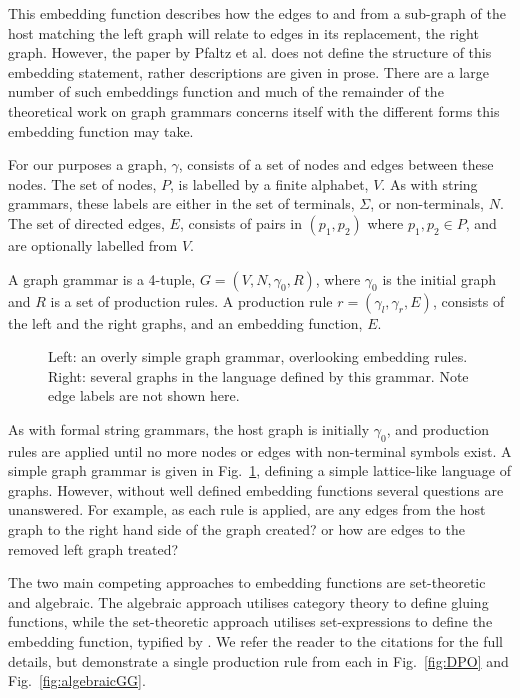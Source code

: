 This embedding function describes how the edges to and from a sub-graph of the host matching the left graph will relate to edges in its replacement, the right graph. However, the paper by Pfaltz et al. does not define the structure of this embedding statement, rather descriptions are given in prose. There are a large number of such embeddings function and much of the remainder of the theoretical work on graph grammars concerns itself with the different forms this embedding function may take. 

For our purposes a graph, $\gamma$, consists of a set of nodes and edges between these nodes. The set of nodes, $P$, is labelled by a finite alphabet, $V$. As with string grammars, these labels are either in the set of terminals, $\Sigma$, or non-terminals, $N$. The set of directed edges, $E$, consists of pairs in $(p_1, p_2)$ where $p_1, p_2 \in P$, and are optionally labelled from $V$.

A graph grammar is a 4-tuple, $G = (V, N, \gamma_0, R)$, where $\gamma_0$ is the initial graph and $R$ is a set of production rules. A production rule $r=(\gamma_l, \gamma_r, E)$, consists of the left and the right graphs, and an embedding function, $E$.

\begin{figure}
\centering
\def\svgwidth{1.\columnwidth}

\caption[A simple graph grammar]{Left: an overly simple graph grammar, overlooking embedding rules. 
Right: several graphs in the language defined by this grammar. Note edge labels are not shown here.}
\label{fig:graphGrammar}
\end{figure}

As with formal string grammars, the host graph is initially $\gamma_0$, and production rules are applied until no more nodes or edges with non-terminal symbols exist. A simple graph grammar is given in Fig.~\ref{fig:graphGrammar}, defining a simple lattice-like language of graphs. However, without well defined embedding functions several questions are unanswered. For example, as each rule is applied, are any edges from the host graph to the right hand side of the graph created? or how are edges to the removed left graph treated?

The two main competing approaches to embedding functions are set-theoretic and algebraic. The algebraic approach utilises category theory to define gluing functions\cite{Ehrig73}, while the set-theoretic approach utilises set-expressions to define the embedding function, typified by \cite{Nagl76}. We refer the reader to the citations for the full details, but demonstrate a single production rule from each in Fig.~\ref{fig:DPO} and Fig.~\ref{fig:algebraicGG}.

